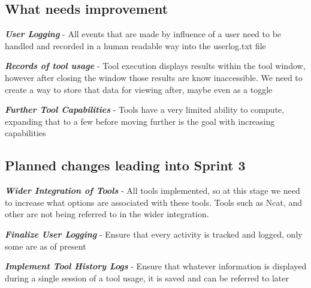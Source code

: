 \documentclass{article}
\begin{document}
\subsection{What needs improvement}
\begin{center}
    \textbf{\textit{User Logging}} - All events that are made by influence of a user need to be handled and recorded in a human readable way into the userlog.txt file
\end{center}
\begin{center}
    \textbf{\textit{Records of tool usage}} - Tool execution displays results within the tool window, however after closing the window those results are know inaccessible. We need to create a way to store that data for viewing after, maybe even as a toggle
\end{center}
\begin{center}
    \textbf{\textit{Further Tool Capabilities}} - Tools have a very limited ability to compute, expanding that to a few before moving further is the goal with increasing capabilities
\end{center}

\subsection{Planned changes leading into Sprint 3}
\begin{center}
    \textbf{\textit{Wider Integration of Tools}} - All tools implemented, so at this stage we need to increase what options are associated with these tools. Tools such as Ncat, and other are not being referred to in the wider integration. 
\end{center}
\begin{center}
    \textbf{\textit{Finalize User Logging}} - Ensure that every activity is tracked and logged, only some are as of present
\end{center}
\begin{center}
    \textbf{\textit{Implement Tool History Logs}} - Ensure that whatever information is displayed during a single session of a tool usage, it is saved and can be referred to later
\end{center}
\end{document}
